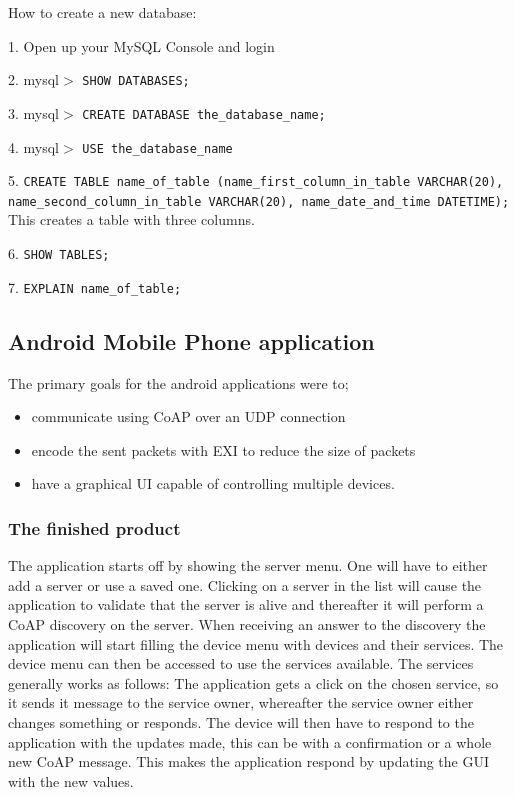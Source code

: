 How to create a new database:

1. 	Open up your MySQL Console and login

2. 	mysql$>$ \texttt{SHOW DATABASES;}

3. 	mysql$>$ \texttt{CREATE DATABASE the_database_name;}

4. 	mysql$>$ \texttt{USE the_database_name}

5. 	\texttt{CREATE TABLE name_of_table (name_first_column_in_table VARCHAR(20), name_second_column_in_table VARCHAR(20), name_date_and_time DATETIME);}
	This creates a table with three columns.
	
6. 	\texttt{SHOW TABLES;}

7. 	\texttt{EXPLAIN name_of_table;}

\subsection{Android Mobile Phone application}

The primary goals for the android applications were to;
\begin{itemize}
 \item communicate using CoAP over an UDP connection
 \item encode the sent packets with EXI to reduce the size of packets
 \item have a graphical UI capable of controlling multiple devices.
\end{itemize}

\subsubsection{The finished product}

The application starts off by showing the server menu. One will have to either add a server or use a saved one. 
Clicking on a server in the list will cause the application to validate that the server is alive and thereafter it will perform a CoAP discovery on the server. 
When receiving an answer to the discovery the application will start filling the device menu with devices and their services. The device menu can then be accessed to use the services available.
The services generally works as follows: The application gets a click on the chosen service, so it sends it message to the service owner, whereafter the service owner either changes something or responds.
The device will then have to respond to the application with the updates made, this can be with a confirmation or a whole new CoAP message. This makes the application respond by updating the GUI with the new values.

